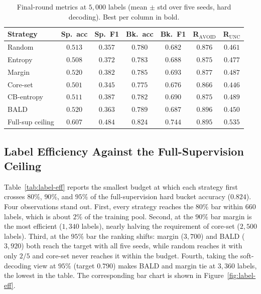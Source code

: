 \documentclass[11pt]{article}
\begin{document}
\begin{table}[h]
\centering
\small
\caption{Final-round metrics at $5{,}000$ labels (mean $\pm$ std over
five seeds, hard decoding). Best per column in bold.}
\label{tab:final-summary}
\begin{tabular}{lcccccc}
\toprule
Strategy & Sp.~acc & Sp.~F1 & Bk.~acc & Bk.~F1 & R$_{\text{AVOID}}$ & R$_{\text{UNC}}$ \\
\midrule
Random      & $0.513$ & $0.357$ & $0.780$ & $0.682$ & $0.876$ & $0.461$ \\
Entropy     & $0.508$ & $0.372$ & $0.783$ & $0.688$ & $0.875$ & $0.477$ \\
Margin      & $\mathbf{0.520}$ & $0.382$ & $0.785$ & $\mathbf{0.693}$ & $0.877$ & $0.487$ \\
Core-set    & $0.501$ & $0.345$ & $0.775$ & $0.676$ & $0.866$ & $0.446$ \\
CB-entropy  & $0.511$ & $\mathbf{0.387}$ & $0.782$ & $0.690$ & $0.875$ & $\mathbf{0.489}$ \\
BALD        & $\mathbf{0.520}$ & $0.363$ & $\mathbf{0.789}$ & $0.687$ & $\mathbf{0.896}$ & $0.450$ \\
\midrule
Full-sup ceiling & $0.607$ & $0.484$ & $0.824$ & $0.744$ & $0.895$ & $0.535$ \\
\bottomrule
\end{tabular}
\end{table}

\subsection{Label Efficiency Against the Full-Supervision Ceiling}

Table~\ref{tab:label-eff} reports the smallest budget at which each
strategy first crosses $80\%$, $90\%$, and $95\%$ of the full-supervision
hard bucket accuracy ($0.824$). Four observations stand out. First, every
strategy reaches the $80\%$ bar within $660$ labels, which is about $2\%$
of the training pool. Second, at the $90\%$ bar margin is the most
efficient ($1{,}340$ labels), nearly halving the requirement of core-set
($2{,}500$ labels). Third, at the $95\%$ bar the ranking shifts: margin
($3{,}700$) and BALD ($3{,}920$) both reach the target with all five
seeds, while random reaches it with only $2/5$ and core-set never reaches
it within the budget. Fourth, taking the soft-decoding view at $95\%$
(target $0.790$) makes BALD and margin tie at $3{,}360$ labels, the lowest
in the table. The corresponding bar chart is shown in
Figure~\ref{fig:label-eff}.
\end{document}

